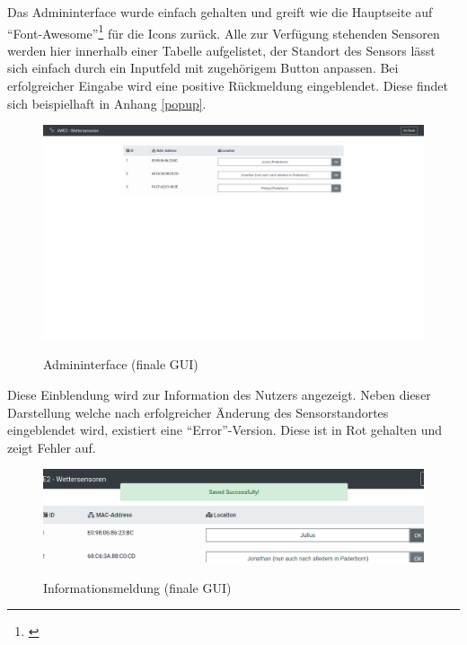 \pagebreak

\label{admininterface}

Das Admininterface wurde einfach gehalten und greift wie die Hauptseite auf \enquote{Font-Awesome}\footnote{\cite{fontawesome}} für die Icons zurück.
Alle zur Verfügung stehenden Sensoren werden hier innerhalb einer Tabelle aufgelistet, der Standort des Sensors lässt sich einfach durch ein Inputfeld mit zugehörigem Button anpassen.
Bei erfolgreicher Eingabe wird eine positive Rückmeldung eingeblendet.
Diese findet sich beispielhaft in Anhang \ref{popup}.

\begin{figure}[h!!]
    \centering
    \begin{minipage}[t]{1\textwidth}
        \caption{Admininterface (finale GUI)}
        \includegraphics[width=1\textwidth]{img/admin.png}\\
        \label{fig:admin}
    \end{minipage}
\end{figure}

\pagebreak

\label{popup}

Diese Einblendung wird zur Information des Nutzers angezeigt.
Neben dieser Darstellung welche nach erfolgreicher Änderung des Sensorstandortes eingeblendet wird, existiert eine \enquote{Error}-Version.
Diese ist in Rot gehalten und zeigt Fehler auf.

\begin{figure}[h!!]
	\centering
	\begin{minipage}[t]{1\textwidth}
		\caption{Informationsmeldung\pagebreak
		(finale GUI)}
		\includegraphics[width=1\textwidth]{img/popup.png}\\
		\label{fig:datumsauswahl}
	\end{minipage}
\end{figure}

